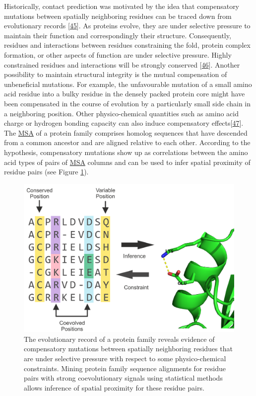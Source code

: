 \documentclass[11pt,a4paper,twoside]{book}
\theoremstyle{definition}
\theoremstyle{definition}
\theoremstyle{remark}
\begin{document}
Historically, contact prediction was motivated by the idea that
compensatory mutations between spatially neighboring residues can be
traced down from evolutionary records
{[}\protect\hyperlink{ref-Gobel1994}{45}{]}. As proteins evolve, they
are under selective pressure to maintain their function and
correspondingly their structure. Consequently, residues and interactions
between residues constraining the fold, protein complex formation, or
other aspects of function are under selective pressure. Highly
constrained residues and interactions will be strongly conserved
{[}\protect\hyperlink{ref-Godzik1989}{46}{]}. Another possibility to
maintain structural integrity is the mutual compensation of unbeneficial
mutations. For example, the unfavourable mutation of a small amino acid
residue into a bulky residue in the densely packed protein core might
have been compensated in the course of evolution by a particularly small
side chain in a neighboring position. Other physico-chemical quantities
such as amino acid charge or hydrogen bonding capacity can also induce
compensatory effects{[}\protect\hyperlink{ref-Neher1994}{47}{]}. The
\protect\hyperlink{abbrev}{MSA} of a protein family comprises homolog
sequences that have descended from a common ancestor and are aligned
relative to each other. According to the hypothesis, compensatory
mutations show up as correlations between the amino acid types of pairs
of \protect\hyperlink{abbrev}{MSA} columns and can be used to infer
spatial proximity of residue pairs (see Figure
\ref{fig:correlated-mutations}).









\begin{figure}

{\centering \includegraphics[width=0.9\linewidth]{img/intro/correlated-mutations-transparent} 

}

\caption{The evolutionary record of a protein
family reveals evidence of compensatory mutations between spatially
neighboring residues that are under selective pressure with respect to
some physico-chemical constraints. Mining protein family sequence
alignments for residue pairs with strong coevolutionary signals using
statistical methods allows inference of spatial proximity for these
residue pairs.}\label{fig:correlated-mutations}
\end{figure}
\end{document}
